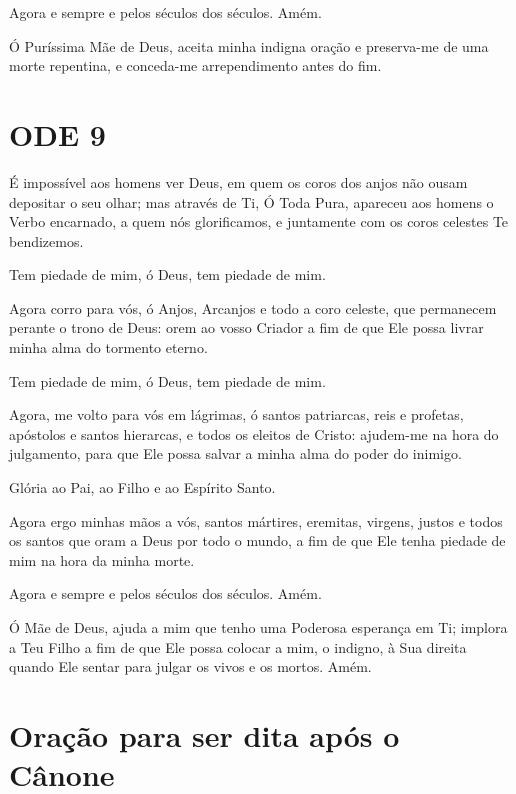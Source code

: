 \documentclass{subfiles}
\begin{document}
Agora e sempre e pelos séculos dos séculos. Amém.

\theotokion{}Ó Puríssima Mãe de Deus, aceita minha indigna oração e
preserva-me de uma morte repentina, e conceda-me arrependimento antes
do fim.

\section*{ODE 9}

\eirmos{}É impossível aos homens ver Deus, em quem os coros dos anjos não
ousam depositar o seu olhar; mas através de Ti, Ó Toda Pura, apareceu aos
homens o Verbo encarnado, a quem nós glorificamos, e juntamente com os
coros celestes Te bendizemos.

Tem piedade de mim, ó Deus, tem piedade de mim.

Agora corro para vós, ó Anjos, Arcanjos e todo a coro celeste, que
permanecem perante o trono de Deus: orem ao vosso Criador a fim de que Ele
possa livrar minha alma do tormento eterno.

Tem piedade de mim, ó Deus, tem piedade de mim.

Agora, me volto para vós em lágrimas, ó santos patriarcas, reis e
profetas, apóstolos e santos hierarcas, e todos os eleitos de Cristo: ajudem-me
na hora do julgamento, para que Ele possa salvar a minha alma do poder do
inimigo.

Glória ao Pai, ao Filho e ao Espírito Santo.

Agora ergo minhas mãos a vós, santos mártires, eremitas, virgens,
justos e todos os santos que oram a Deus por todo o mundo, a fim de que Ele
tenha piedade de mim na hora da minha morte.

Agora e sempre e pelos séculos dos séculos. Amém.

\theotokion{}Ó Mãe de Deus, ajuda a mim que tenho uma Poderosa esperança
em Ti; implora a Teu Filho a fim de que Ele possa colocar a mim, o indigno, à
Sua direita quando Ele sentar para julgar os vivos e os mortos. Amém.

\section*{Oração para ser dita após o Cânone}
\end{document}
